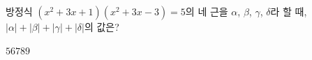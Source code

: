 방정식 $(x^2+3x+1)(x^2+3x-3)=5$의 네 근을 $\alpha$, $\beta$, $\gamma$, $\delta$라 할 때, $|\alpha|+|\beta|+|\gamma|+|\delta|$의 값은?
\begin{choices32}{$5$}{$6$}{$7$}{$8$}{$9$}\end{choices32}
